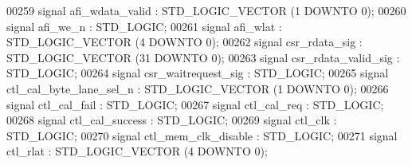 \begin{DoxyCode}
00259                 \textcolor{keywordflow}{signal} \textcolor{vhdlchar}{afi_wdata_valid} \textcolor{vhdlchar}{:}  \textcolor{comment}{STD\_LOGIC\_VECTOR} \textcolor{vhdlchar}{(}\textcolor{vhdllogic}{}\textcolor{vhdllogic}{1} \textcolor{keywordflow}{DOWNTO} \textcolor{vhdllogic}{}\textcolor{vhdllogic}{0}\textcolor{vhdlchar}{)};
00260                 \textcolor{keywordflow}{signal} \textcolor{vhdlchar}{afi_we_n} \textcolor{vhdlchar}{:}  \textcolor{comment}{STD\_LOGIC};
00261                 \textcolor{keywordflow}{signal} \textcolor{vhdlchar}{afi_wlat} \textcolor{vhdlchar}{:}  \textcolor{comment}{STD\_LOGIC\_VECTOR} \textcolor{vhdlchar}{(}\textcolor{vhdllogic}{}\textcolor{vhdllogic}{4} \textcolor{keywordflow}{DOWNTO} \textcolor{vhdllogic}{}\textcolor{vhdllogic}{0}\textcolor{vhdlchar}{)};
00262                 \textcolor{keywordflow}{signal} \textcolor{vhdlchar}{csr_rdata_sig} \textcolor{vhdlchar}{:}  \textcolor{comment}{STD\_LOGIC\_VECTOR} \textcolor{vhdlchar}{(}\textcolor{vhdllogic}{}\textcolor{vhdllogic}{31} \textcolor{keywordflow}{DOWNTO} \textcolor{vhdllogic}{}\textcolor{vhdllogic}{0}\textcolor{vhdlchar}{)};
00263                 \textcolor{keywordflow}{signal} \textcolor{vhdlchar}{csr_rdata_valid_sig} \textcolor{vhdlchar}{:}  \textcolor{comment}{STD\_LOGIC};
00264                 \textcolor{keywordflow}{signal} \textcolor{vhdlchar}{csr_waitrequest_sig} \textcolor{vhdlchar}{:}  \textcolor{comment}{STD\_LOGIC};
00265                 \textcolor{keywordflow}{signal} \textcolor{vhdlchar}{ctl_cal_byte_lane_sel_n} \textcolor{vhdlchar}{:}  \textcolor{comment}{STD\_LOGIC\_VECTOR} \textcolor{vhdlchar}{(}\textcolor{vhdllogic}{}\textcolor{vhdllogic}{1} \textcolor{keywordflow}{DOWNTO} \textcolor{vhdllogic}{}\textcolor{vhdllogic}{0}\textcolor{vhdlchar}{)};
00266                 \textcolor{keywordflow}{signal} \textcolor{vhdlchar}{ctl_cal_fail} \textcolor{vhdlchar}{:}  \textcolor{comment}{STD\_LOGIC};
00267                 \textcolor{keywordflow}{signal} \textcolor{vhdlchar}{ctl_cal_req} \textcolor{vhdlchar}{:}  \textcolor{comment}{STD\_LOGIC};
00268                 \textcolor{keywordflow}{signal} \textcolor{vhdlchar}{ctl_cal_success} \textcolor{vhdlchar}{:}  \textcolor{comment}{STD\_LOGIC};
00269                 \textcolor{keywordflow}{signal} \textcolor{vhdlchar}{ctl_clk} \textcolor{vhdlchar}{:}  \textcolor{comment}{STD\_LOGIC};
00270                 \textcolor{keywordflow}{signal} \textcolor{vhdlchar}{ctl_mem_clk_disable} \textcolor{vhdlchar}{:}  \textcolor{comment}{STD\_LOGIC};
00271                 \textcolor{keywordflow}{signal} \textcolor{vhdlchar}{ctl_rlat} \textcolor{vhdlchar}{:}  \textcolor{comment}{STD\_LOGIC\_VECTOR} \textcolor{vhdlchar}{(}\textcolor{vhdllogic}{}\textcolor{vhdllogic}{4} \textcolor{keywordflow}{DOWNTO} \textcolor{vhdllogic}{}\textcolor{vhdllogic}{0}\textcolor{vhdlchar}{)};

\end{DoxyCode}
